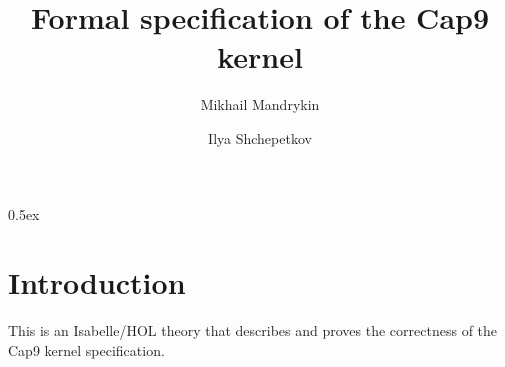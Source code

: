\documentclass[11pt,a4paper]{article}
\begin{document}
\title{Formal specification of the Cap9 kernel}
\author{Mikhail Mandrykin \and Ilya Shchepetkov}
\maketitle

\tableofcontents

\parindent 0pt\parskip 0.5ex

\section{Introduction}

This is an Isabelle/HOL theory that describes and proves the correctness of the Cap9 kernel specification.



%
%
\end{document}
